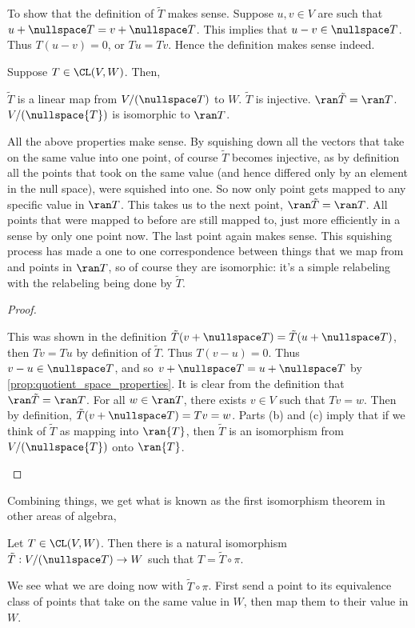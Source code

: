 \documentclass{article}
\begin{document}
  To show that the definition of $\tilde{T}$ makes sense. Suppose $u, v \in V$ are such that $u + \nullspace T = v + \nullspace T$. This implies that $u - v \in \nullspace T$. Thus $T(u - v)
  = 0$, or $Tu = Tv$. Hence the definition makes sense indeed.
  \begin{prop}
    Suppose $T \in \CL(V, W)$. Then,
    \begin{enumerate}[label=\alph*)]
      \ii $\tilde{T}$ is a linear map from $V/(\nullspace T)$ to $W$.
      \ii $\tilde{T}$ is injective.
      \ii $\ran\tilde{T} = \ran T$.
      \ii $V/(\nullspace{T})$ is isomorphic to $\ran T$.
    \end{enumerate}
  \end{prop}
  All the above properties make sense. By squishing down all the vectors that take on the same value into one point, of course $\tilde{T}$ becomes injective, as by definition all the points
  that took on the same value (and hence differed only by an element in the null space), were squished into one. So now only point gets mapped to any specific value in $\ran T$. This takes us
  to the next point, $\ran\tilde{T} = \ran T$. All points that were mapped to before are still mapped to, just more efficiently in a sense by only one point now. The last point again makes
  sense. This squishing process has made a one to one correspondence between things that we map from and points in $\ran T$, so of course they are isomorphic: it's a simple relabeling with
  the relabeling being done by $\tilde{T}$.
  \begin{proof}
    \begin{enumerate}[label=\alph*)]
      \ii This was shown in the definition
      \ii $\tilde{T}(v + \nullspace T) = \tilde{T}(u + \nullspace T)$, then $Tv = Tu$ by definition of $\tilde{T}$. Thus $T(v - u) = 0$. Thus $v - u \in \nullspace T$, and so $v + \nullspace
      T = u + \nullspace T$ by \eqref{prop:quotient_space_properties}.
      \ii It is clear from the definition that $\ran\tilde{T} = \ran T$. For all $w \in \ran T$, there exists $v \in V$ such that $Tv = w$. Then by definition, $\tilde{T}(v + \nullspace T) =
      Tv = w$.
      \ii Parts (b) and (c) imply that if we think of $\tilde{T}$ as mapping into $\ran{T}$, then $\tilde{T}$ is an isomorphism from $V/(\nullspace{T})$ onto $\ran{T}$.
    \end{enumerate}
  \end{proof}
  Combining things, we get what is known as the first isomorphism theorem in other areas of algebra,
  \begin{prop}
    Let $T \in \CL(V, W)$. Then there is a natural isomorphism $\tilde{T}: V/(\nullspace T) \to W$ such that $T = \tilde{T}\circ\pi$.
  \end{prop}
  We see what we are doing now with $\tilde{T}\circ\pi$. First send a point to its equivalence class of points that take on the same value in $W$, then map them to their value in $W$. 
\end{document}
